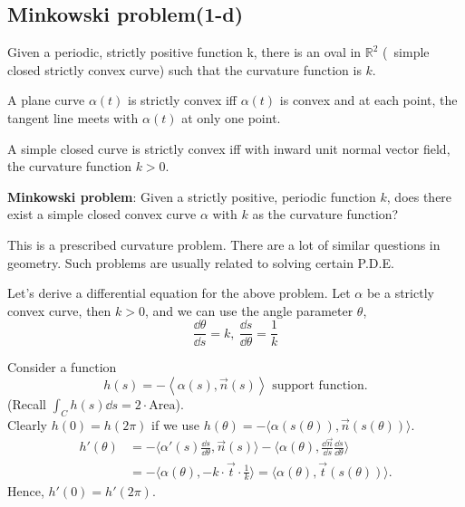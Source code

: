 \subsection{Minkowski problem(1-d)}
\begin{theorem}
    \label{thm: Minkowski problem}
    Given a periodic, strictly positive function k, there is an oval in 
    $\mathbb{R}^2$ (\ie\ simple closed strictly convex curve) such that 
    the curvature function is $k$. 
\end{theorem}
\begin{definition}
    A plane curve $\alpha(t)$ is strictly convex iff $\alpha(t)$ is convex 
    and at each point, the tangent line meets with $\alpha(t)$ at only 
    one point.
\end{definition}
\begin{proposition}
    A simple closed curve is strictly convex iff with inward unit normal 
    vector field, the curvature function $k>0$. 
\end{proposition}
\textbf{Minkowski problem}: Given a strictly positive, periodic function
$k$, does there exist a simple closed convex curve $\alpha$ with $k$
as the curvature function?
\begin{remark}
    This is a prescribed curvature problem. There are a lot of similar 
    questions in geometry. Such problems are usually related to solving
    certain P.D.E.
\end{remark}
Let's derive a differential equation for the above problem. Let $\alpha$ be 
a strictly convex curve, then $k>0$, and we can use the angle parameter $\theta$, \ie\ 
\[\frac{\dd\theta}{\dd s}=k,~\frac{\dd s}{\dd \theta}=\frac{1}{k} \]
\begin{center}
\end{center}
Consider a function
\[
    h(s)=-\left<\alpha(s),\vec{n}(s)\right>\text{ support function}.
\]
(Recall $\int_C h(s)\dd s=2\cdot\mathrm{Area}$).\\
Clearly $h(0)=h(2\pi)$ if
 we use 
 $h(\theta)=-\langle\alpha\left(s(\theta)\right),\vec{n}\left(s(\theta)\right)\rangle$. 
 \begin{align*}
    h'(\theta)&=-\langle \alpha'(s)\frac{\dd s}{\dd\theta},\vec{n}(s)\rangle
    -\langle \alpha(\theta),\frac{\dd \vec{n}}{\dd s}\frac{\dd s}{\dd \theta}\rangle\\
    &=-\langle \alpha(\theta),-k\cdot\vec{t}\cdot\frac{1}{k}\rangle =\langle\alpha(\theta),\vec{t}\left(s(\theta)\right)\rangle
.\end{align*}
Hence, $h'(0)=h'(2\pi)$.

